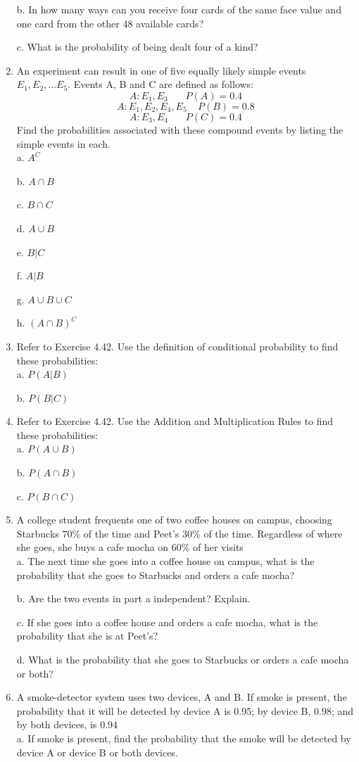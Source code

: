 \documentclass{article}
\begin{document}
\begin{enumerate}
b. In how many ways can you receive four cards of the same face value and one card from the other 48 available cards?

c. What is the probability of being dealt four of a kind?

\item An experiment can result in one of five equally likely simple events $E_1,E_2,...E_5.$ Events A, B and C are defined as follows: \\ 
$$ A:E_1,E_3 \:\:\:\:\:\:\:\: P(A) = 0.4 $$
$$ A:E_1,E_2,E_4,E_5 \:\:\:\:\: P(B) = 0.8 $$
$$ A:E_3,E_4 \:\:\:\:\:\:\:\: P(C) = 0.4 $$
Find the probabilities associated with these compound events by listing the simple events in each. \\
a. $A^C$

b. $A \cap B$

c. $B \cap C$

d. $A \cup B$

e. $B|C$

f. $A|B$

g. $A \cup B \cup C$

h. $(A \cap B)^C$

\item Refer to Exercise 4.42. Use the definition of conditional probability to find these probabilities: \\
a. $P(A|B)$

b. $P(B|C)$
\item Refer to Exercise 4.42. Use the Addition and Multiplication Rules to find these probabilities: \\
a. $P(A \cup B)$

b. $P(A \cap B)$

c. $P(B \cap C)$
\item A college student frequents one of two coffee houses on campus, choosing Starbucks 70\% of the time and Peet’s 30\% of the time. Regardless of where she goes, she buys a cafe mocha on 60\% of her visits \\
a. The next time she goes into a coffee house on campus, what is the probability that she goes to Starbucks and orders a cafe mocha?

b. Are the two events in part a independent? Explain.

c. If she goes into a coffee house and orders a cafe mocha, what is the probability that she is at Peet’s?

d. What is the probability that she goes to Starbucks or orders a cafe mocha or both?
\item A smoke-detector system uses two devices, A and B. If smoke is present, the probability that it will be detected by device A is 0.95; by device B, 0.98; and by both devices, is 0.94 \\
a. If smoke is present, find the probability that the smoke will be detected by device A or device B or both devices.


\end{enumerate}
\end{document}
